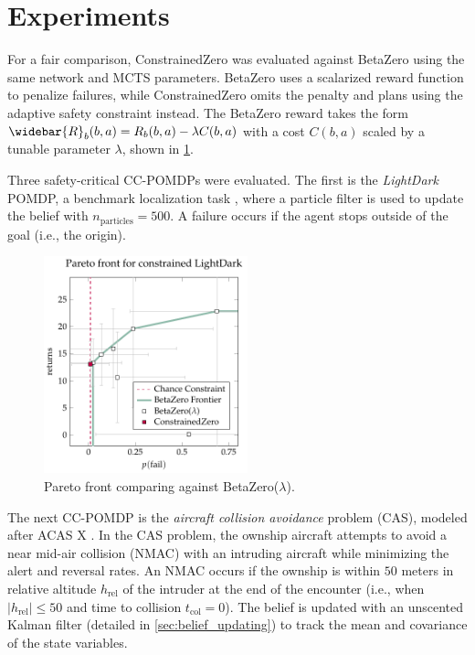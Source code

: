 \section{Experiments}
For a fair comparison, ConstrainedZero was evaluated against BetaZero using the same network and MCTS parameters.
BetaZero uses a scalarized reward function to penalize failures, while ConstrainedZero omits the penalty and plans using the adaptive safety constraint instead.
The BetaZero reward takes the form $\widebar{R}_b(b,a) = R_b(b,a) - \lambda C(b,a)$ with a cost $C(b,a)$ scaled by a tunable parameter $\lambda$, shown in \cref{fig:pareto}.

Three safety-critical CC-POMDPs were evaluated.
The first is the \textit{LightDark} POMDP, a benchmark localization task \cite{platt2010belief}, where a particle filter is used to update the belief with $n_\text{particles}=500$.
A failure occurs if the agent stops outside of the goal (i.e., the origin).


\begin{figure}[t!]
    \centering
    \includegraphics[width=0.525\textwidth]{figures/constrainedzero/results/cz-pareto.pdf}
    \caption{Pareto front comparing against BetaZero($\lambda$).}
    \label{fig:pareto}
\end{figure}


The next CC-POMDP is the \textit{aircraft collision avoidance} problem (CAS),  modeled after ACAS X \cite{kochenderfer2012next}.
In the CAS problem, the ownship aircraft attempts to avoid a near mid-air collision (NMAC) with an intruding aircraft while minimizing the alert and reversal rates.
An NMAC occurs if the ownship is within $50$ meters in relative altitude $h_\text{rel}$ of the intruder at the end of the encounter (i.e., when $|h_\text{rel}| \le 50$ and time to collision $t_\text{col}=0$).
The belief is updated with an unscented Kalman filter \cite{wan2000unscented} (detailed in \cref{sec:belief_updating}) to track the mean and covariance of the state variables.

